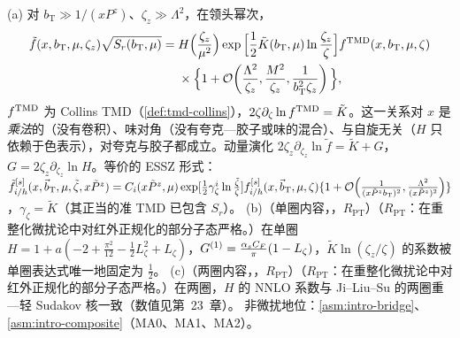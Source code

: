 \begin{theorem}\label{thm:lamet-quasi-tmd}
(a) 对 $b_{\mathrm T}\gg1/(xP^z)$、$\zeta_z\gg\Lambda^2$，在领头幂次，
\begin{equation}\label{eq:lamet-qtmd}
\begin{split}
\tilde f(x,b_{\mathrm T},\mu,\zeta_z)\sqrt{S_r(b_{\mathrm T},\mu)}={}&H\Big(\frac{\zeta_z}{\mu^2}\Big)\exp\Big[\frac12\tilde K(b_{\mathrm T},\mu)\ln\frac{\zeta_z}\zeta\Big]f^{\rm TMD}(x,b_{\mathrm T},\mu,\zeta)\\
&\times\Big\{1+\mathcal{O}\!\left(\frac{\Lambda^2}{\zeta_z},\frac{M^2}{\zeta_z},\frac1{b_{\mathrm T}^2\zeta_z}\right)\Big\},
\end{split}
\end{equation}%
$f^{\rm TMD}$ 为 Collins TMD（\cref{def:tmd-collins}），$2\zeta\partial_\zeta\ln f^{\rm TMD}=\tilde K$。这一关系对 $x$ 是\emph{乘法}的（没有卷积）、味对角（没有夸克—胶子或味的混合）、与自旋无关（$H$ 只依赖于色表示），对夸克与胶子都成立。动量演化 $2\zeta_z\partial_{\zeta_z}\ln\tilde f=\tilde K+G$，$G=2\zeta_z\partial_{\zeta_z}\ln H$。等价的 ESSZ 形式：$\tilde f^{[s]}_{i/h}(x,\vec b_{\mathrm T},\mu,\tilde\zeta,x\tilde P^z)=C_i(x\tilde P^z,\mu)\exp[\frac12\gamma^i_\zeta\ln\frac{\tilde\zeta}\zeta]f^{[s]}_{i/h}(x,\vec b_{\mathrm T},\mu,\zeta)\{1+\mathcal{O}\!\left(\frac1{(x\tilde P^zb_{\mathrm T})^2},\frac{\Lambda^2}{(x\tilde P^z)^2}\right)\}$，$\gamma_\zeta=\tilde K$（其正当的准 TMD 已包含 $S_r$）。
(b)（单圈内容，\tagR，$R_{\mathrm{PT}}$）（$R_{\mathrm{PT}}$：在重整化微扰论中对红外正规化的部分子态严格。）在单圈 $H=1+a(-2+\frac{\pi^2}{12}-\frac12L_\zeta^2+L_\zeta)$，$G^{(1)}=\frac{\alpha_s C_F}\pi(1-L_\zeta)$，$\tilde K\ln(\zeta_z/\zeta)$ 的系数被单圈表达式唯一地固定为 $\frac12$。
(c)（两圈内容，\tagR，$R_{\mathrm{PT}}$）（$R_{\mathrm{PT}}$：在重整化微扰论中对红外正规化的部分子态严格。）在两圈，$H$ 的 NNLO 系数\cite{delRio:2023pse}与 Ji--Liu--Su 的两圈重—轻 Sudakov 核一致（数值见第~23~章）。
非微扰地位：\cref{asm:intro-bridge}、\cref{asm:intro-composite}（MA0、MA1、MA2）。
\end{theorem}

